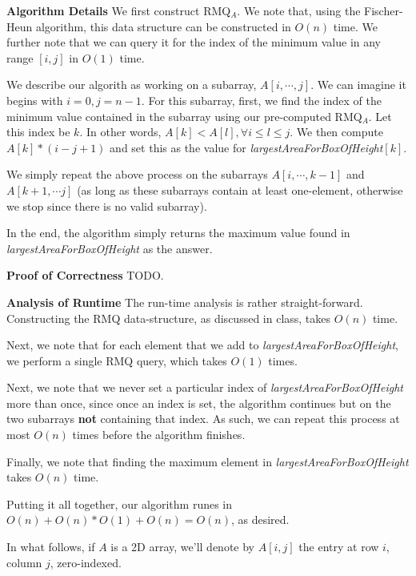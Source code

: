 \documentclass[12pt]{exam}
\newcommand{\Q}[1]{\question{\large{\textbf{#1}}}}
\newcommand*{\bigo}[1]{O \left( #1 \right)}
\begin{document}
\begin{questions}
\begin{solution}
\textbf{Algorithm Details}
We first construct RMQ$_A$. We note that, using the Fischer-Heun algorithm, this data structure can be constructed in $\bigo{n}$ time. We further note that we can query it for the index of the minimum value in any range $[i,j]$ in $\bigo{1}$ time.

We describe our algorith as working on a subarray, $A[i,\cdots,j]$. We can imagine it begins with $i = 0, j = n -1$. For this subarray, first, we find the index of the minimum value contained in the subarray using our pre-computed RMQ$_A$. Let this index be $k$. In other words, $A[k] < A[l], \forall i \leq l \leq j$. We then compute $A[k] * (i - j + 1)$ and set this as the value for \textit{largestAreaForBoxOfHeight}$[k]$. 

We simply repeat the above process on the subarrays $A[i, \cdots, k-1]$ and $A[k + 1, \cdots j]$ (as long as these subarrays contain at least one-element, otherwise we stop since there is no valid subarray).

In the end, the algorithm simply returns the maximum value found in \textit{largestAreaForBoxOfHeight} as the answer.

\textbf{Proof of Correctness}
TODO.

\textbf{Analysis of Runtime}
The run-time analysis is rather straight-forward. Constructing the RMQ data-structure, as discussed in class, takes $\bigo{n}$ time.

Next, we note that for each element that we add to \textit{largestAreaForBoxOfHeight}, we perform a single RMQ query, which takes $\bigo{1}$ times. 

Next, we note that we never set a particular index of \textit{largestAreaForBoxOfHeight} more than once, since once an index is set, the algorithm continues but on the two subarrays \textbf{not} containing that index. As such, we can repeat this process at most $\bigo{n}$ times before the algorithm finishes.

Finally, we note that finding the maximum element in \textit{largestAreaForBoxOfHeight} takes $\bigo{n}$ time. 

Putting it all together, our algorithm runes in $\bigo{n} + \bigo{n} * \bigo{1} + \bigo{n} = \bigo{n}$, as desired.



\end{solution}

\newpage
\Q{Problem Two: Area Minimum Queries (4 Points)}

In what follows, if $A$ is a 2D array, we'll denote by $A[i, j]$ the entry at row $i$, column $j$, zero-indexed.


\end{questions}
\end{document}
